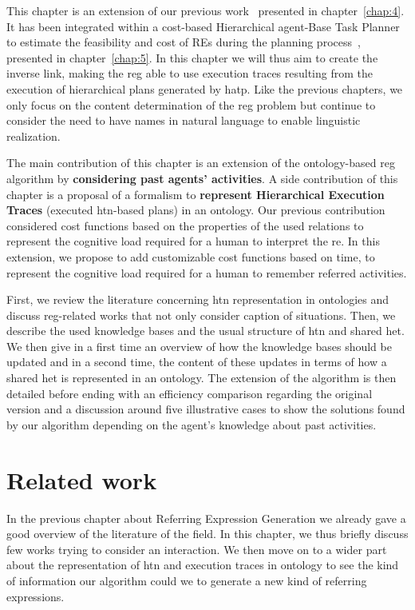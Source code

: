 This chapter is an extension of our previous work~\cite{buisan_2020_efficient} presented in chapter~\ref{chap:4}. It has been integrated within a cost-based Hierarchical agent-Base Task Planner to estimate the feasibility and cost of REs during the planning process~\cite{buisan_2020_human}, presented in chapter~\ref{chap:5}. In this chapter we will thus aim to create the inverse link, making the \acrshort{reg} able to use execution traces resulting from the execution of hierarchical plans generated by \acrshort{hatp}. Like the previous chapters, we only focus on the content determination of the \acrshort{reg} problem but continue to consider the need to have names in natural language to enable linguistic realization.

The main contribution of this chapter is an extension of the ontology-based \acrshort{reg} algorithm by \textbf{considering past agents' activities}. A side contribution of this chapter is a proposal of a formalism to \textbf{represent Hierarchical Execution Traces} (executed \acrshort{htn}-based plans) in an ontology. Our previous contribution considered cost functions based on the properties of the used relations to represent the cognitive load required for a human to interpret the \acrshort{re}. In this extension, we propose to add customizable cost functions based on time, to represent the cognitive load required for a human to remember referred activities.

First, we review the literature concerning \acrshort{htn} representation in ontologies and discuss \acrshort{reg}-related works that not only consider caption of situations. Then, we describe the used knowledge bases and the usual structure of \acrshort{htn} and shared \acrfull{het}. We then give in a first time an overview of how the knowledge bases should be updated and in a second time, the content of these updates in terms of how a shared \acrfull{het} is represented in an ontology. The extension of the algorithm is then detailed before ending with an efficiency comparison regarding the original version and a discussion around five illustrative cases to show the solutions found by our algorithm depending on the agent's knowledge about past activities.

\section{Related work}

In the previous chapter about Referring Expression Generation we already gave a good overview of the literature of the field. In this chapter, we thus briefly discuss few works trying to consider an interaction. We then move on to a wider part about the representation of \acrshort{htn} and execution traces in ontology to see the kind of information our algorithm could we to generate a new kind of referring expressions.

